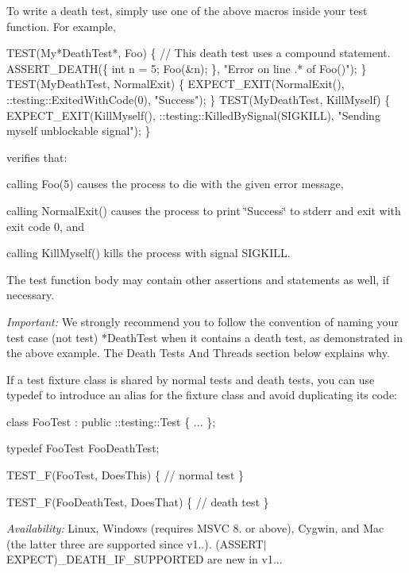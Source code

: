 To write a death test, simply use one of the above macros inside your test function. For example,


\begin{DoxyCode}
TEST(My*DeathTest*, Foo) \{
  // This death test uses a compound statement.
  ASSERT\_DEATH(\{ int n = 5; Foo(&n); \}, "Error on line .* of Foo()");
\}
TEST(MyDeathTest, NormalExit) \{
  EXPECT\_EXIT(NormalExit(), ::testing::ExitedWithCode(0), "Success");
\}
TEST(MyDeathTest, KillMyself) \{
  EXPECT\_EXIT(KillMyself(), ::testing::KilledBySignal(SIGKILL), "Sending myself unblockable signal");
\}
\end{DoxyCode}


verifies that\+:


\begin{DoxyItemize}
\item calling {\ttfamily Foo(5)} causes the process to die with the given error message,
\item calling {\ttfamily Normal\+Exit()} causes the process to print {\ttfamily \char`\"{}\+Success\char`\"{}} to stderr and exit with exit code 0, and
\item calling {\ttfamily Kill\+Myself()} kills the process with signal {\ttfamily S\+I\+G\+K\+I\+LL}.
\end{DoxyItemize}

The test function body may contain other assertions and statements as well, if necessary.

{\itshape Important\+:} We strongly recommend you to follow the convention of naming your test case (not test) {\ttfamily $\ast$\+Death\+Test} when it contains a death test, as demonstrated in the above example. The {\ttfamily Death Tests And Threads} section below explains why.

If a test fixture class is shared by normal tests and death tests, you can use typedef to introduce an alias for the fixture class and avoid duplicating its code\+: 
\begin{DoxyCode}
class FooTest : public ::testing::Test \{ ... \};

typedef FooTest FooDeathTest;

TEST\_F(FooTest, DoesThis) \{
  // normal test
\}

TEST\_F(FooDeathTest, DoesThat) \{
  // death test
\}
\end{DoxyCode}


{\itshape Availability\+:} Linux, Windows (requires M\+S\+VC 8. or above), Cygwin, and Mac (the latter three are supported since v1..). {\ttfamily (A\+S\+S\+E\+R\+T$\vert$\+E\+X\+P\+E\+CT)\+\_\+\+D\+E\+A\+T\+H\+\_\+\+I\+F\+\_\+\+S\+U\+P\+P\+O\+R\+T\+ED} are new in v1...

